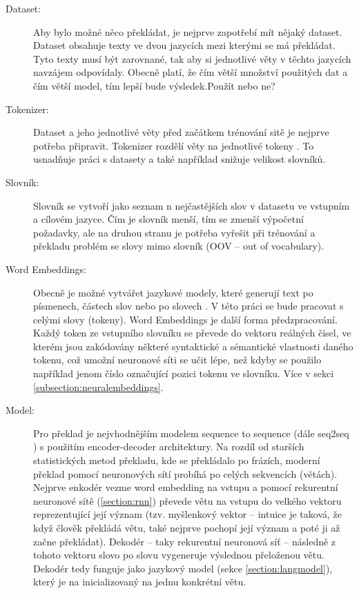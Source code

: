 \begin{description}
  \item[Dataset:] Aby bylo možné něco překládat, je nejprve zapotřebí mít nějaký dataset. Dataset obsahuje texty ve dvou jazycích mezi kterými se má překládat. Tyto texty musí být zarovnané, tak aby si jednotlivé věty v těchto jazycích navzájem odpovídaly. Obecně platí, že čím větší množství použitých dat a čím větší model, tím lepší bude výsledek.Použít nebo ne?\cite{googleLimits}

  \item[Tokenizer:] Dataset a jeho jednotlivé věty před začátkem trénování sitě je nejprve potřeba připravit. Tokenizer rozdělí věty na jednotlivé tokeny . To usnadňuje práci s datasety a také například snižuje velikost slovníků.

  \item[Slovník:] Slovník se vytvoří jako seznam n nejčastějších slov v datasetu ve vstupním a cílovém jazyce. Čím je slovník menší, tím se zmenší výpočetní požadavky, ale na druhou stranu je potřeba vyřešit při trénování a překladu problém se slovy mimo slovník (OOV -- out of vocabulary). 

  \item[Word Embeddings:] Obecně je možné vytvářet jazykové modely, které generují text po písmenech, částech slov nebo po slovech \cite{mikolovSubwords}. V této práci se bude pracovat s celými slovy (tokeny). Word Embeddings je další forma předzpracování. Každý token ze vstupního slovníku se převede do vektoru reálných čísel, ve kterém jsou zakódovány některé syntaktické a sémantické vlastnosti daného tokenu, což umožní neuronové síti se učit lépe, než kdyby se použilo například jenom číslo označující pozici tokenu ve slovníku.  Více v sekci \ref{subsection:neuralembeddings}.

  \item[Model:] Pro překlad je nejvhodnějším modelem sequence to sequence (dále seq2seq \cite{seq2seq}) s použitím encoder-decoder architektury. Na rozdíl od starších statistických metod překladu, kde se překládalo po frázích, moderní překlad pomocí neuronových sítí probíhá po celých sekvencích (větách). Nejprve enkodér vezme word embedding na vstupu a pomocí rekurentní neuronové sítě (\ref{section:rnn}) převede větu na vstupu do velkého vektoru reprezentující její význam (tzv. myšlenkový vektor -- intuice je taková, že když člověk překládá větu, také nejprve pochopí její význam a poté ji až začne překládat). Dekodér -- taky rekurentní neuronová síť -- následně z tohoto vektoru slovo po slovu vygeneruje výslednou přeloženou větu. Dekodér tedy funguje jako jazykový model (sekce \ref{section:langmodel}), který je na inicializovaný na jednu konkrétní větu.
\end{description}


